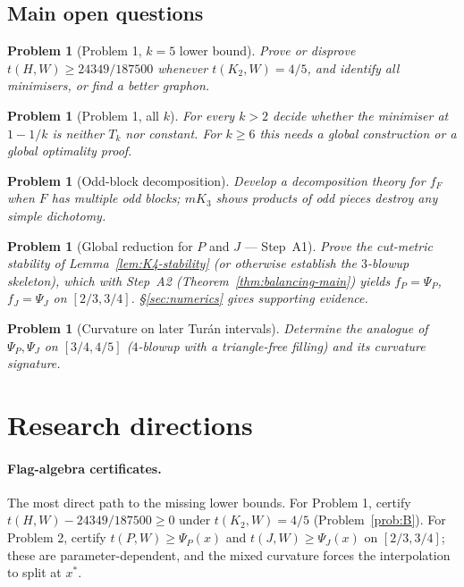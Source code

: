 \documentclass[11pt]{amsart}
\newtheorem{problem}[theorem]{Problem}
\theoremstyle{definition}
\newcommand{\1}{\mathbf 1}
\begin{document}
\subsection{Main open questions}

\begin{problem}[Problem 1, $k=5$ lower bound]
Prove or disprove $t(H,W)\ge 24349/187500$ whenever $t(K_2,W)=4/5$, and identify
all minimisers, or find a better graphon.
\end{problem}

\begin{problem}[Problem 1, all $k$]
For every $k>2$ decide whether the minimiser at $1-1/k$ is neither $T_k$ nor
constant.  For $k\ge6$ this needs a global construction or a global optimality
proof.
\end{problem}

\begin{problem}[Odd-block decomposition]
Develop a decomposition theory for $f_F$ when $F$ has multiple odd blocks; $mK_3$
shows products of odd pieces destroy any simple dichotomy.
\end{problem}

\begin{problem}[Global reduction for $P$ and $J$ --- Step~A1]
Prove the cut-metric stability of Lemma~\ref{lem:K4-stability} (or otherwise
establish the $3$-blowup skeleton), which with Step~A2
(Theorem~\ref{thm:balancing-main}) yields $f_P=\Psi_P$, $f_J=\Psi_J$ on
$[2/3,3/4]$.  \S\ref{sec:numerics} gives supporting evidence.
\end{problem}

\begin{problem}[Curvature on later Tur\'an intervals]
Determine the analogue of $\Psi_P,\Psi_J$ on $[3/4,4/5]$ ($4$-blowup with a
triangle-free filling) and its curvature signature.
\end{problem}

\section{Research directions}
\label{sec:directions}

\paragraph{Flag-algebra certificates.}  The most direct path to the missing lower
bounds.  For Problem 1, certify $t(H,W)-24349/187500\ge0$ under $t(K_2,W)=4/5$
(Problem~\ref{prob:B}).  For Problem 2, certify $t(P,W)\ge\Psi_P(x)$ and
$t(J,W)\ge\Psi_J(x)$ on $[2/3,3/4]$; these are parameter-dependent, and the mixed
curvature forces the interpolation to split at $x^*$.
\end{document}
